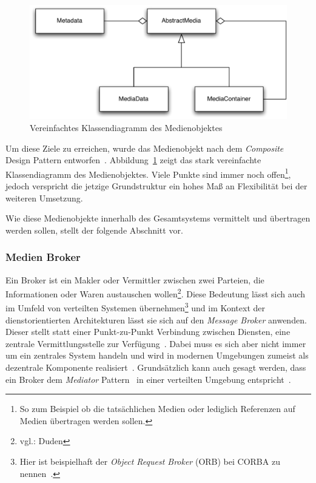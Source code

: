 \begin{figure}[ht]
  \centering
    \includegraphics[width=.9\textwidth]{images/Medienobjekt.pdf}
  \caption{Vereinfachtes Klassendiagramm des Medienobjektes}
  \label{fig:medienobjekt}
\end{figure}

  Um diese Ziele zu erreichen, wurde das Medienobjekt nach dem \emph{Composite} Design Pattern entworfen~\citep[S. 163]{design_patterns}. Abbildung~\ref{fig:medienobjekt} zeigt das stark vereinfachte Klassendiagramm des Medienobjektes. Viele Punkte sind immer noch offen\footnote{So zum Beispiel ob die tatsächlichen Medien oder lediglich Referenzen auf Medien übertragen werden sollen.}, jedoch verspricht die jetzige Grundstruktur ein hohes Maß an Flexibilität bei der weiteren Umsetzung.
  
  Wie diese Medienobjekte innerhalb des Gesamtsystems vermittelt und übertragen werden sollen, stellt der folgende Abschnitt vor.


\subsubsection{Medien Broker} %
\label{ssub:media_broker}

  Ein Broker ist ein Makler oder Vermittler zwischen zwei Parteien, die Informationen oder Waren austauschen wollen\footnote{vgl.: Duden}. Diese Bedeutung lässt sich auch im Umfeld von verteilten Systemen übernehmen\footnote{Hier ist beispielhaft der \emph{Object Request Broker} (ORB) bei CORBA zu nennen~\citep{coulouris2001ds,balzert1999lo}.} und im Kontext der dienstorientierten Architekturen lässt sie sich auf den \emph{Message Broker} anwenden. Dieser stellt statt einer Punkt-zu-Punkt Verbindung zwischen Diensten, eine zentrale Vermittlungsstelle zur Verfügung~\citep[S. 71]{web_services}. Dabei muss es sich aber nicht immer um ein zentrales System handeln und wird in modernen Umgebungen zumeist als dezentrale Komponente realisiert~\citep{enterprise_service_bus}. Grundsätzlich kann auch gesagt werden, dass ein Broker dem \emph{Mediator} Pattern~\citep[S. 273]{design_patterns} in einer verteilten Umgebung entspricht~\citep[S. 83]{enterprise_integration_patterns}.
  

